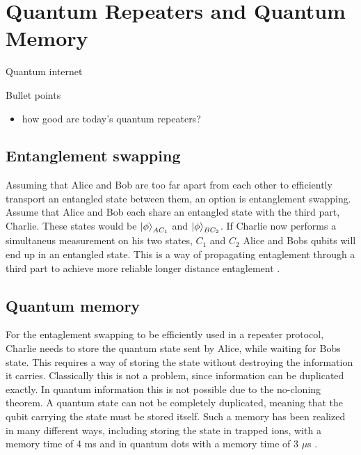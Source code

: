\section{Quantum Repeaters and Quantum Memory}
Quantum internet \cite{Azuma:2023}
\begin{mybox}{Bullet points}
    \begin{itemize}
        \item how good are today's quantum repeaters? 
    \end{itemize}
\end{mybox}

\subsection{Entanglement swapping}

Assuming that Alice and Bob are too far apart from each other to efficiently transport an entangled state between them,
an option is entanglement swapping. Assume that Alice and Bob each share an entangled state with the third part, Charlie.
These states would be $\ket{\phi}_{AC_1}$ and $\ket{\phi}_{BC_2}$. If Charlie now performs a simultaneus measurement on his two states, $C_1$ and $C_2$
Alice and Bobs qubits will end up in an entangled state. This is a way of propagating entaglement through a third part to achieve more reliable longer distance entaglement \cite{Azuma:2023}.

\subsection{Quantum memory}

For the entaglement swapping to be efficiently used in a repeater protocol, 
Charlie needs to store the quantum state sent by Alice, while waiting for Bobs state. This requires a way of storing the state without destroying the information it carries.
Classically this is not a problem, since information can be duplicated exactly. In quantum information this is not possible due to the no-cloning theorem.
A quantum state can not be completely duplicated, meaning that the qubit carrying the state must be stored itself.
Such a memory has been realized in many different ways, including storing the state in trapped ions, with a memory time of 4 ms \cite{trapped_ion_memory} and in quantum dots with a memory time of 3 $\mu$s \cite{dot_memory}.


